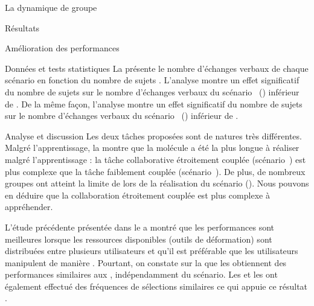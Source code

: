 \documentclass[myfrancais,ngerman,english,french]{mythesis}
\begin{document}
\begin{mychapter}{La dynamique de groupe}
\begin{mysection}{Résultats}
\begin{mysubsection}{Amélioration des performances}
\begin{mysubsubsection}{Données et tests statistiques}
					La  présente le nombre d'échanges verbaux  de chaque scénario  en fonction du nombre de sujets .
					L'analyse montre un effet significatif du nombre de sujets  sur le nombre d'échanges verbaux  du scénario~ () inférieur de .
					De la même façon, l'analyse montre un effet significatif du nombre de sujets  sur le nombre d'échanges verbaux  du scénario~ () inférieur de .
				\end{mysubsubsection}
				\begin{mysubsubsection}{Analyse et discussion}
					Les deux tâches proposées sont de natures très différentes.
					Malgré l'apprentissage, la  montre que la molécule \myUbiquitin a été la plus longue à réaliser malgré l'apprentissage : la tâche collaborative étroitement couplée (scénario~) est plus complexe que la tâche faiblement couplée (scénario~).
					De plus, de nombreux groupes ont atteint la limite de  lors de la réalisation du scénario  (\myUbiquitin).
					Nous pouvons en déduire que la collaboration étroitement couplée est plus complexe à appréhender.

					L'étude précédente présentée dans le  a montré que les performances sont meilleures lorsque les ressources disponibles (outils de déformation) sont distribuées entre plusieurs utilisateurs et qu'il est préférable que les utilisateurs manipulent de manière .
					Pourtant, on constate sur la  que les  obtiennent des performances similaires aux , indépendamment du scénario.
					Les  et les  ont également effectué des fréquences de sélections similaires ce qui appuie ce résultat .


\end{mysubsubsection}
\end{mysubsection}
\end{mysection}
\end{mychapter}
\end{document}
